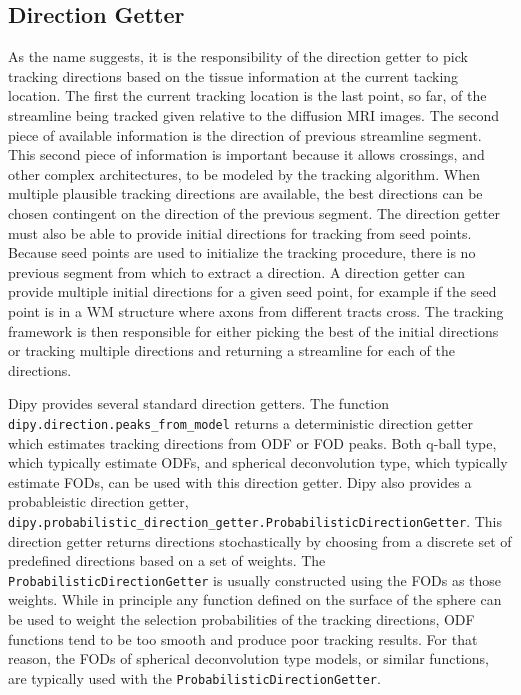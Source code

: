 \subsection{Direction Getter}
    As the name suggests, it is the responsibility of the direction getter to pick tracking directions based on the tissue information at the current tacking location. The first the current tracking location is the last point, so far, of the streamline being tracked given relative to the diffusion MRI images. The second piece of available information is the direction of previous streamline segment. This second piece of information is important because it allows crossings, and other complex architectures, to be modeled by the tracking algorithm. When multiple plausible tracking directions are available, the best directions can be chosen contingent on the direction of the previous segment. The direction getter must also be able to provide initial directions for tracking from seed points. Because seed points are used to initialize the tracking procedure, there is no previous segment from which to extract a direction. A direction getter can provide multiple initial directions for a given seed point, for example if the seed point is in a WM structure where axons from different tracts cross. The tracking framework is then responsible for either picking the best of the initial directions or tracking multiple directions and returning a streamline for each of the directions.
    
    Dipy provides several standard direction getters. The function \verb|dipy.direction.peaks_from_model| returns a deterministic direction getter which estimates tracking directions from ODF or FOD peaks. Both q-ball type, which typically estimate ODFs, and spherical deconvolution type, which typically estimate FODs, can be used with this direction getter. Dipy also provides a probableistic direction getter, \verb|dipy.probabilistic_direction_getter.ProbabilisticDirectionGetter|. This direction getter returns directions stochastically by choosing from a discrete set of predefined directions based on a set of weights. The \verb|ProbabilisticDirectionGetter| is usually constructed using the FODs as those weights. While in principle any function defined on the surface of the sphere can be used to weight the selection probabilities of the tracking directions, ODF functions tend to be too smooth and produce poor tracking results. For that reason, the FODs of spherical deconvolution type models, or similar functions, are typically used with the \verb|ProbabilisticDirectionGetter|.

